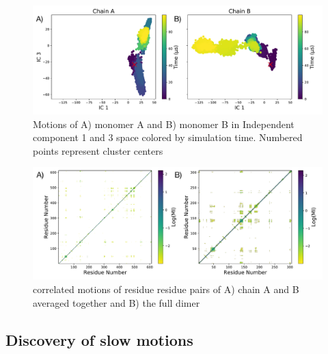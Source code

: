\documentclass{biophys-new}
\begin{document}
\begin{figure}[h]
\centering
\graphicspath{ {./figures/} }
\includegraphics[width=0.6\linewidth]{fig_4_fdiscolortime_ic3_label.pdf}
\caption{Motions of A) monomer A and B) monomer B in Independent component 1 and 3 space colored by simulation time. Numbered points represent cluster centers}
\label{fig:view}
\end{figure}

\begin{figure}[h]
\centering
\graphicspath{ {./figures/} }
\includegraphics[width=0.6\linewidth]{MI_full_and_average.pdf}
\caption{correlated motions of residue residue pairs of A) chain A and B averaged together and B) the full dimer }
\label{fig:view}
\end{figure}

\subsection*{Discovery of slow motions}
\end{document}
